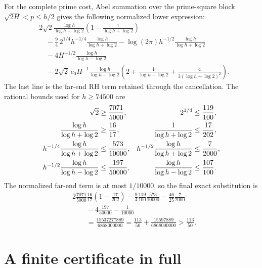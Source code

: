 \documentclass[11pt]{amsart}
\theoremstyle{definition}
\theoremstyle{remark}
\numberwithin{equation}{section}
\begin{document}
For the complete prime cost, Abel summation over the prime-square block
$\sqrt{2H}<p\le h/2$ gives the following normalized lower expression:
\begin{align*}
 &2\sqrt2\frac{\log h}{\log h+\log2}
    \left(1-\frac1{\log h+\log2}\right)\\
 &\quad-\frac94\,2^{1/4}h^{-1/4}
    \frac{\log h}{\log h+\log2}
 -\log(2\pi)h^{-1/2}
    \frac{\log h}{\log h+\log2}\\
 &\quad-4H^{-1/2}\frac{\log h}{\log h-\log2}\\
 &\quad-2\sqrt2\,c_0H^{-1}\frac{\log h}{\log h-\log2}
    \left(2+\frac1{\log h-\log2}
      +\frac4{3(\log h-\log2)^2}\right).
\end{align*}
The last line is the far-end RH term retained through the cancellation.
The rational bounds used for $h\ge74500$ are
\begin{align}\label{eq:cost-rational-data}
 \sqrt2&\ge\frac{7071}{5000}, & 2^{1/4}&\le\frac{119}{100},\notag\\
 \frac{\log h}{\log h+\log2}&\ge\frac{16}{17}, &
 \frac1{\log h+\log2}&\le\frac{17}{202},\notag\\
 h^{-1/4}\frac{\log h}{\log h+\log2}&\le\frac{573}{10000}, &
 h^{-1/2}\frac{\log h}{\log h+\log2}&\le\frac7{2000},\notag\\
 h^{-1/2}\frac{\log h}{\log h-\log2}&\le\frac{197}{50000}, &
 \frac{\log h}{\log h-\log2}&\le\frac{107}{100}.
\end{align}
The normalized far-end term is at most $1/10000$, so the final exact
substitution is
\begin{align*}
 &2\frac{7071}{5000}\frac{16}{17}
    \left(1-\frac{17}{202}\right)
 -\frac94\frac{119}{100}\frac{573}{10000}
 -\frac{46}{25}\frac7{2000}\\
 &\hspace{2em}-4\frac{197}{50000}-\frac1{10000}\\
 &\qquad=
 \frac{15537277889}{6868000000}
 =\frac{113}{50}+\frac{15597889}{6868000000}
 >\frac{113}{50}.
\end{align*}

\section{A finite certificate in full}\label{app:certificate}
\end{document}
